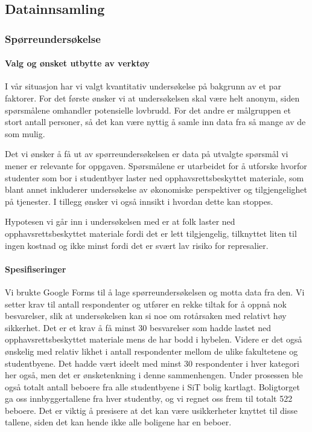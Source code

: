 \subsection{Datainnsamling}

\subsubsection{Spørreundersøkelse}

\paragraph{Valg og ønsket utbytte av verktøy}
I vår situasjon har vi valgt kvantitativ undersøkelse på bakgrunn av et par faktorer. For det første ønsker vi at undersøkelsen skal være helt anonym, siden spørsmålene omhandler potensielle lovbrudd. For det andre er målgruppen et stort antall personer, så det kan være nyttig å samle inn data fra så mange av de som mulig. 

Det vi ønsker å få ut av spørreundersøkelsen er data på utvalgte spørsmål vi mener er relevante for oppgaven. Spørsmålene er utarbeidet for å utforske hvorfor studenter som bor i studentbyer laster ned opphavsrettsbeskyttet materiale, som blant annet inkluderer undersøkelse av økonomiske perspektiver og tilgjengelighet på tjenester. I tillegg ønsker vi også innsikt i hvordan dette kan stoppes.

Hypotesen vi går inn i undersøkelsen med er at folk laster ned opphavsrettsbeskyttet materiale fordi det er lett tilgjengelig, tilknyttet liten til ingen kostnad og ikke minst fordi det er svært lav risiko for represalier.

\paragraph{Spesifiseringer}
Vi brukte Google Forms til å lage spørreundersøkelsen og motta data fra den. Vi setter krav til antall respondenter og utfører en rekke tiltak for å oppnå nok besvarelser, slik at undersøkelsen kan si noe om rotårsaken med relativt høy sikkerhet. Det er et krav å få minst 30 besvarelser som hadde lastet ned opphavsrettsbeskyttet materiale mens de har bodd i hybelen. Videre er det også ønskelig med relativ likhet i antall respondenter mellom de ulike fakultetene og studentbyene. Det hadde vært ideelt med minst 30 respondenter i hver kategori her også, men det er ønsketenkning i denne sammenhengen. Under prosessen ble også totalt antall beboere fra alle studentbyene i SiT bolig kartlagt. Boligtorget ga oss innbyggertallene fra hver studentby, og vi regnet oss frem til totalt 522 beboere. Det er viktig å presisere at det kan være usikkerheter knyttet til disse tallene, siden det kan hende ikke alle boligene har en beboer.

